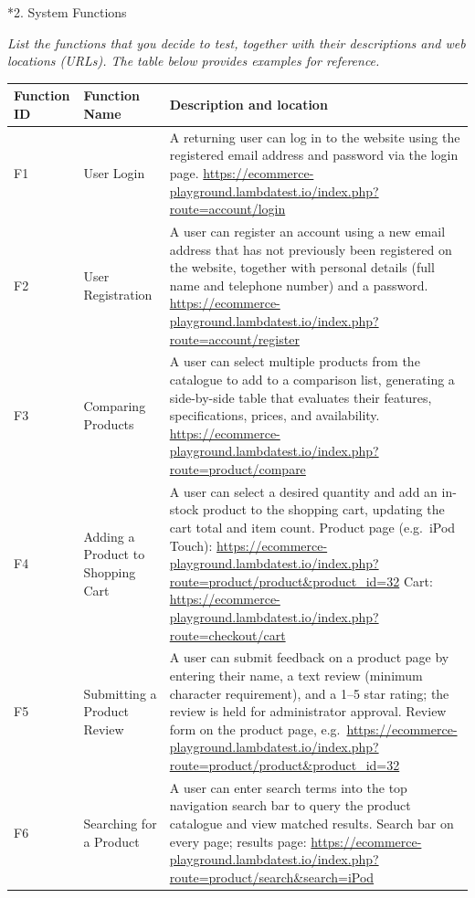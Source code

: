 \documentclass[11pt,a4paper]{article}
\makeatletter
\renewcommand\section{\@startsection{section}{1}{0pt}{3ex plus 1ex}{1.2ex}{\LARGE\bfseries}}
\newcommand{\instr}[1]{{\color{utsblue}\itshape #1\par}}
\makeatother
\begin{document}
\section*{2. System Functions}
\instr{List the functions that you decide to test, together with their descriptions and web locations (URLs). The table below provides examples for reference.}

{\renewcommand{\arraystretch}{1.3}
\begin{longtable}{|M{2.6cm}|M{3.4cm}|L{10.0cm}|}
\hline
\textbf{Function ID} & \textbf{Function Name} & \textbf{Description and location} \\ \hline
\endhead
F1 & User Login &
A returning user can log in to the website using the registered email address and password via the login page.\newline
\url{https://ecommerce-playground.lambdatest.io/index.php?route=account/login} \\ \hline
F2 & User Registration &
A user can register an account using a new email address that has not previously been registered on the website, together with personal details (full name and telephone number) and a password.\newline
\url{https://ecommerce-playground.lambdatest.io/index.php?route=account/register} \\ \hline
F3 & Comparing Products &
A user can select multiple products from the catalogue to add to a comparison list, generating a side-by-side table that evaluates their features, specifications, prices, and availability.\newline
\url{https://ecommerce-playground.lambdatest.io/index.php?route=product/compare} \\ \hline
F4 & Adding a Product to Shopping Cart &
A user can select a desired quantity and add an in-stock product to the shopping cart, updating the cart total and item count.\newline
Product page (e.g.\ iPod Touch): \url{https://ecommerce-playground.lambdatest.io/index.php?route=product/product&product_id=32}\newline
Cart: \url{https://ecommerce-playground.lambdatest.io/index.php?route=checkout/cart} \\ \hline
F5 & Submitting a Product Review &
A user can submit feedback on a product page by entering their name, a text review (minimum character requirement), and a 1--5 star rating; the review is held for administrator approval.\newline
Review form on the product page, e.g.\ \url{https://ecommerce-playground.lambdatest.io/index.php?route=product/product&product_id=32} \\ \hline
F6 & Searching for a Product &
A user can enter search terms into the top navigation search bar to query the product catalogue and view matched results.\newline
Search bar on every page; results page: \url{https://ecommerce-playground.lambdatest.io/index.php?route=product/search&search=iPod} \\ \hline
\end{longtable}}
\end{document}
